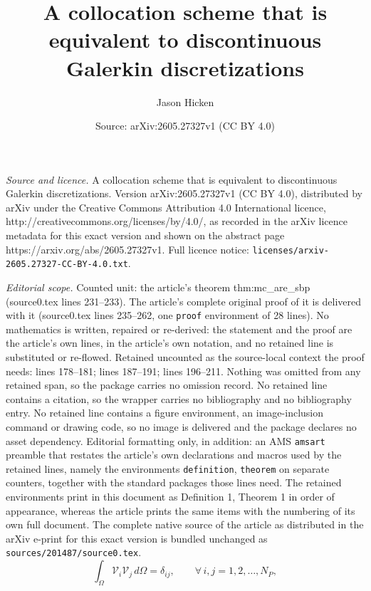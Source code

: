 \documentclass[10pt,a4paper]{amsart}
\title{A collocation scheme that is equivalent to discontinuous Galerkin discretizations}
\author{Jason Hicken}
\date{Source: arXiv:2605.27327v1 (CC BY 4.0)}
\newcommand{\fnc}[1]{\ensuremath{\mathcal{#1}}}
\begin{document}
\maketitle

\noindent\emph{Source and licence.} A collocation scheme that is equivalent to discontinuous Galerkin discretizations. Version arXiv:2605.27327v1 (CC BY 4.0), distributed by arXiv under the Creative Commons Attribution 4.0 International licence, http://creativecommons.org/licenses/by/4.0/, as recorded in the arXiv licence metadata for this exact version and shown on the abstract page https://arxiv.org/abs/2605.27327v1. Full licence notice: \texttt{licenses/arxiv-2605.27327-CC-BY-4.0.txt}.\par\smallskip

\noindent\textit{Editorial scope.} Counted unit: the article's theorem thm:mc\_are\_sbp (source0.tex lines 231--233). The article's complete original proof of it is delivered with it (source0.tex lines 235--262, one \texttt{proof} environment of 28 lines). No mathematics is written, repaired or re-derived: the statement and the proof are the article's own lines, in the article's own notation, and no retained line is substituted or re-flowed.  Retained uncounted as the source-local context the proof needs: lines 178--181; lines 187--191; lines 196--211.  Nothing was omitted from any retained span, so the package carries no omission record.  No retained line contains a citation, so the wrapper carries no bibliography and no bibliography entry.  No retained line contains a figure environment, an image-inclusion command or drawing code, so no image is delivered and the package declares no asset dependency.  Editorial formatting only, in addition: an AMS \texttt{amsart} preamble that restates the article's own declarations and macros used by the retained lines, namely the environments \texttt{definition}, \texttt{theorem} on separate counters, together with the standard packages those lines need.  The retained environments print in this document as Definition 1, Theorem 1 in order of appearance, whereas the article prints the same items with the numbering of its own full document.  The complete native source of the article as distributed in the arXiv e-print for this exact version is bundled unchanged as \texttt{sources/201487/source0.tex}.
\begin{equation}\label{eq:ortho}
    \int_{\Omega} \fnc{V}_i \fnc{V}_j \,d\Omega = \delta_{ij},
    \qquad\forall\, i,j = 1, 2, \ldots, N_P,
\end{equation}
\end{document}
